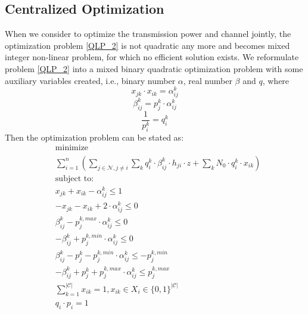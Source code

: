 \documentclass[times]{ettauth}
\newcommand{\ie}{i.e., }
\theoremstyle{mytheoremstyle}
\theoremstyle{mytheoremstyle}
\theoremstyle{mytheoremstyle}
\begin{document}
\subsection{Centralized Optimization}
\label{opt_channelAndPower}
When we consider to optimize the transmission power and channel jointly, the optimization problem \ref{QLP_2} is not quadratic any more and becomes mixed integer non-linear problem, for which no efficient solution exists.
We reformulate problem \ref{QLP_2} into a mixed binary quadratic optimization problem with some auxiliary variables created, \ie binary number $\alpha$, real number $\beta$ and $q$, where
	\begin{equation}
	\label{alpha_opt}
x_{jk}\cdot x_{ik} =\alpha_{ij}^k
	\end{equation}
	\begin{equation}
	\label{beta_opt}
\beta_{ij}^k = p_j^k\cdot \alpha_{ij}^k
	\end{equation}
	\begin{equation}
	\label{q_opt_2}	
\frac{1}{p_i^k} = q_i^k
	\end{equation}
Then the optimization problem can be stated as:
	\begin{equation}
\label{midp}
			\begin{aligned}
			& \underset{}{\text{minimize}}\\
			&\sum\limits^{n}_{i=1}(\sum\limits_{j\in\mathcal{N}, j\neq i}\sum\limits_k q_{i}^k\cdot \beta_{ij}^k \cdot h_{ji}\cdot z + \sum\limits_k N_0\cdot q_{i}^k\cdot x_{ik})\\
			& \text{subject to:} \\
			& x_{jk} + x_{ik} - \alpha_{ij}^k\leq 1 \\
			& -x_{jk} - x_{ik} +2\cdot \alpha_{ij}^k \leq 0 \\
			& \beta_{ij}^k - p_j^{k,max}\cdot \alpha_{ij}^k \leq 0 \\
			& - \beta_{ij}^k + p_j^{k,min}\cdot \alpha_{ij}^k \leq 0 \\
			& \beta_{ij}^k - p_j^k - p_j^{k,min}\cdot \alpha_{ij}^k \leq -p_j^{k,min} \\			
			& -\beta_{ij}^k + p_j^k + p_j^{k,max}\cdot \alpha_{ij}^k \leq p_j^{k,max} \\			
			& \sum\limits_{k=1}^{|\mathcal{C}|}x_{ik}=1, x_{ik}\in X_i\in \{0,1\}^{|\mathcal{C}|}\\
			& q_i\cdot p_i =1\\
			\end{aligned}
		\end{equation}
\end{document}
